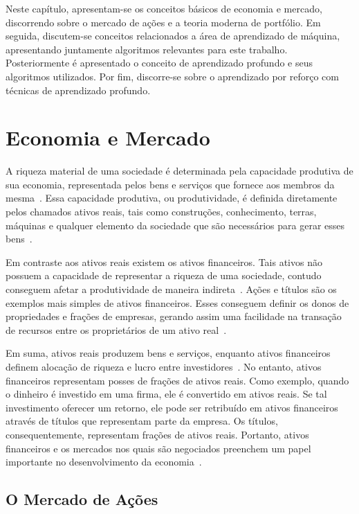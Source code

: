 \label{cap:fund}

Neste capítulo, apresentam-se os conceitos básicos de economia e mercado, discorrendo sobre o mercado de ações e a teoria moderna de portfólio. Em seguida, discutem-se conceitos relacionados a área de aprendizado de máquina, apresentando juntamente algoritmos relevantes para este trabalho. Posteriormente é apresentado o conceito de aprendizado profundo e seus algoritmos utilizados. Por fim, discorre-se sobre o aprendizado por reforço com técnicas de aprendizado profundo.

\section{Economia e Mercado}

A riqueza material de uma sociedade é determinada pela capacidade produtiva de sua economia, representada pelos bens e serviços que fornece aos membros da mesma~\cite{investments}. Essa capacidade produtiva, ou produtividade, é definida diretamente pelos chamados ativos reais, tais como construções, conhecimento, terras, máquinas e qualquer elemento da sociedade que são necessários para gerar esses bens~\cite{investments}.

Em contraste aos ativos reais existem os ativos financeiros. Tais ativos não possuem a capacidade de representar a riqueza de uma sociedade, contudo conseguem afetar a produtividade de maneira indireta~\cite{investments}. Ações e títulos são os exemplos mais simples de ativos financeiros. Esses conseguem definir os donos de propriedades e frações de empresas, gerando assim uma facilidade na transação de recursos entre os proprietários de um ativo real~\cite{investments}.

Em suma, ativos reais produzem bens e serviços, enquanto ativos financeiros definem alocação de riqueza e lucro entre investidores~\cite{investments}. No entanto, ativos financeiros representam posses de frações de ativos reais. Como exemplo, quando o dinheiro é investido em uma firma, ele é convertido em ativos reais. Se tal investimento oferecer um retorno, ele pode ser retribuído em ativos financeiros através de títulos que representam parte da empresa. Os títulos, consequentemente, representam frações de ativos reais. Portanto, ativos financeiros e os mercados nos quais são negociados preenchem um papel importante no desenvolvimento da economia~\cite{investments}.

\subsection{O Mercado de Ações}

